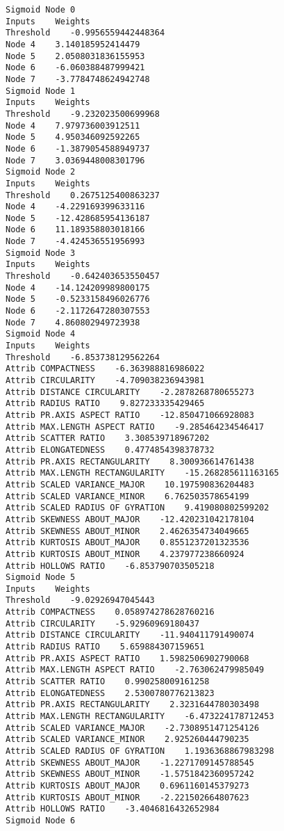\documentclass[
	article,			%
	11pt,				%
	oneside,			%
	a4paper,			%
	english,			%
	brazil,				%
	sumario=tradicional
	]{abntex2}
\begin{document}
\begin{lstlisting}
Sigmoid Node 0
Inputs    Weights
Threshold    -0.9956559442448364
Node 4    3.140185952414479
Node 5    2.0508031836155953
Node 6    -6.060388487999421
Node 7    -3.7784748624942748
Sigmoid Node 1
Inputs    Weights
Threshold    -9.232023500699968
Node 4    7.979736003912511
Node 5    4.950346092592265
Node 6    -1.3879054588949737
Node 7    3.0369448008301796
Sigmoid Node 2
Inputs    Weights
Threshold    0.2675125400863237
Node 4    -4.229169399633116
Node 5    -12.428685954136187
Node 6    11.189358803018166
Node 7    -4.424536551956993
Sigmoid Node 3
Inputs    Weights
Threshold    -0.642403653550457
Node 4    -14.124209989800175
Node 5    -0.5233158496026776
Node 6    -2.1172647280307553
Node 7    4.860802949723938
Sigmoid Node 4
Inputs    Weights
Threshold    -6.853738129562264
Attrib COMPACTNESS    -6.363988816986022
Attrib CIRCULARITY    -4.709038236943981
Attrib DISTANCE CIRCULARITY    -2.2878268780655273
Attrib RADIUS RATIO    9.827233335429465
Attrib PR.AXIS ASPECT RATIO    -12.850471066928083
Attrib MAX.LENGTH ASPECT RATIO    -9.285464234546417
Attrib SCATTER RATIO    3.308539718967202
Attrib ELONGATEDNESS    0.4774854398378732
Attrib PR.AXIS RECTANGULARITY    8.300936614761438
Attrib MAX.LENGTH RECTANGULARITY    -15.268285611163165
Attrib SCALED VARIANCE_MAJOR    10.197590836204483
Attrib SCALED VARIANCE_MINOR    6.762503578654199
Attrib SCALED RADIUS OF GYRATION    9.419080802599202
Attrib SKEWNESS ABOUT_MAJOR    -12.420231042178104
Attrib SKEWNESS ABOUT_MINOR    2.4626354734049665
Attrib KURTOSIS ABOUT_MAJOR    0.8551237201323536
Attrib KURTOSIS ABOUT_MINOR    4.237977238660924
Attrib HOLLOWS RATIO    -6.853790703505218
Sigmoid Node 5
Inputs    Weights
Threshold    -9.02926947045443
Attrib COMPACTNESS    0.058974278628760216
Attrib CIRCULARITY    -5.92960969180437
Attrib DISTANCE CIRCULARITY    -11.940411791490074
Attrib RADIUS RATIO    5.659884307159651
Attrib PR.AXIS ASPECT RATIO    1.5982506902790068
Attrib MAX.LENGTH ASPECT RATIO    -2.763062479985049
Attrib SCATTER RATIO    0.990258009161258
Attrib ELONGATEDNESS    2.5300780776213823
Attrib PR.AXIS RECTANGULARITY    2.3231644780303498
Attrib MAX.LENGTH RECTANGULARITY    -6.473224178712453
Attrib SCALED VARIANCE_MAJOR    -2.7308951471254126
Attrib SCALED VARIANCE_MINOR    2.925260444790235
Attrib SCALED RADIUS OF GYRATION    1.1936368867983298
Attrib SKEWNESS ABOUT_MAJOR    -1.2271709145788545
Attrib SKEWNESS ABOUT_MINOR    -1.5751842360957242
Attrib KURTOSIS ABOUT_MAJOR    0.6961160145379273
Attrib KURTOSIS ABOUT_MINOR    -2.221502664807623
Attrib HOLLOWS RATIO    -3.4046816432652984
Sigmoid Node 6

\end{lstlisting}
\end{document}
